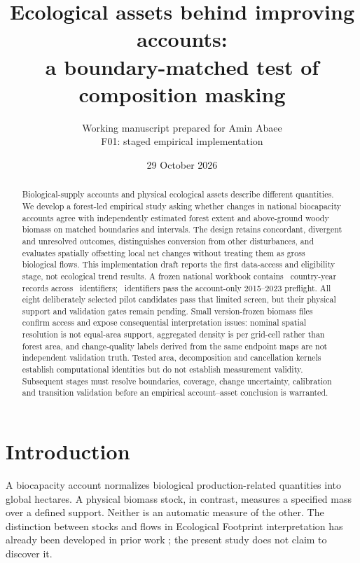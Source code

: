 \documentclass[11pt,a4paper]{article}
\title{Ecological assets behind improving accounts:\\a boundary-matched test of composition masking}
\author{Working manuscript prepared for Amin Abaee\\\small F01: staged empirical implementation}
\date{29 October 2026}
\begin{document}
\maketitle
\begin{center}
\end{center}
\begin{abstract}
Biological-supply accounts and physical ecological assets describe different quantities. We develop a forest-led empirical study asking whether changes in national biocapacity accounts agree with independently estimated forest extent and above-ground woody biomass on matched boundaries and intervals. The design retains concordant, divergent and unresolved outcomes, distinguishes conversion from other disturbances, and evaluates spatially offsetting local net changes without treating them as gross biological flows. This implementation draft reports the first data-access and eligibility stage, not ecological trend results. A frozen national workbook contains \NationalRows\ country-year records across \CountryIDs\ identifiers; \AccountPass\ identifiers pass the account-only 2015--2023 preflight. All eight deliberately selected pilot candidates pass that limited screen, but their physical support and validation gates remain pending. Small version-frozen biomass files confirm access and expose consequential interpretation issues: nominal spatial resolution is not equal-area support, aggregated density is per grid-cell rather than forest area, and change-quality labels derived from the same endpoint maps are not independent validation truth. Tested area, decomposition and cancellation kernels establish computational identities but do not establish measurement validity. Subsequent stages must resolve boundaries, coverage, change uncertainty, calibration and transition validation before an empirical account--asset conclusion is warranted.
\end{abstract}

\section{Introduction}
A biocapacity account normalizes biological production-related quantities into global hectares. A physical biomass stock, in contrast, measures a specified mass over a defined support. Neither is an automatic measure of the other. The distinction between stocks and flows in Ecological Footprint interpretation has already been developed in prior work \citep{Mancini2017}; the present study does not claim to discover it.
\end{document}
